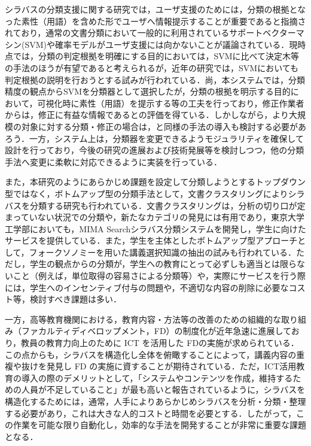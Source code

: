 \documentclass[japanese]{jnlp_1.4}
\begin{document}
シラバスの分類支援に関する研究\cite{Article_Miyazaki_2005}では，ユーザ支援のためには，分類の根拠となった素性（用語）を含めた形でユーザへ情報提示することが重要であると指摘されており，通常の文書分類において一般的に利用されているサポートベクターマシン(SVM)や確率モデルがユーザ支援には向かないことが議論されている．現時点では，分類の判定根拠を明確にする目的においては，SVMに比べて決定木\cite{Inproc_Lewis_1994}等の手法のほうが有望であると考えられるが，近年の研究では，SVMにおいても判定根拠の説明を行おうとする試みが行われている\cite{Inproc_Itabashi_2008}．尚，本システムでは，分類精度の観点からSVMを分類器として選択したが，分類の根拠を明示する目的において，可視化時に素性（用語）を提示する等の工夫を行っており，修正作業者からは，修正に有益な情報であるとの評価を得ている．しかしながら，より大規模の対象に対する分類・修正の場合は，\cite{Inproc_Itabashi_2008}と同様の手法の導入も検討する必要があろう．一方，システム上は，分類器を変更できるようモジュラリティを確保して設計を行っており，今後の研究の進展および技術発展等を検討しつつ，他の分類手法へ変更に柔軟に対応できるように実装を行っている．

また，本研究のようにあらかじめ課題を設定して分類しようとするトップダウン型ではなく，ボトムアップ型の分類手法として，文書クラスタリングによりシラバスを分類する研究も行われている\cite{Article_Nozawa_2005}．文書クラスタリングは，分析の切り口が定まっていない状況での分類や，新たなカテゴリの発見には有用であり，東京大学工学部においても，MIMA Searchシラバス分類システム\cite{Inproc_Mima_2006a,Web_MIMA_Search}を開発し，学生に向けたサービスを提供している．また，学生を主体としたボトムアップ型アプローチとして，フォークソノミーを用いた講義選択知識の抽出の試みも行われている\cite{Inproc_Nishijima_2008}．ただし，学生の観点からの分類が，学生への教育にとって必ずしも適当とは限らないこと（例えば，単位取得の容易さによる分類等）や，実際にサービスを行う際には，学生へのインセンティブ付与の問題や，不適切な内容の削除に必要なコスト等，検討すべき課題は多い．

一方，高等教育機関における，教育内容・方法等の改善のための組織的な取り組み（ファカルティディベロップメント，FD）の制度化が近年急速に進展しており，教員の教育力向上のために ICT を活用した FDの実施が求められている\cite{Techrep_NIME_2008}．この点からも，シラバスを構造化し全体を俯瞰することによって，講義内容の重複や抜けを発見し FD の実施に資することが期待されている．ただ，ICT活用教育の導入の際のデメリットとして，「システムやコンテンツを作成，維持するための人員が不足していること」が最も高いと報告されているように\cite{Techrep_NIME_2008}，シラバスを構造化するためには，通常，人手によりあらかじめシラバスを分析・分類・整理する必要があり，これは大きな人的コストと時間を必要とする．したがって，この作業を可能な限り自動化し，効率的な手法を開発することが非常に重要な課題となる．
\end{document}
